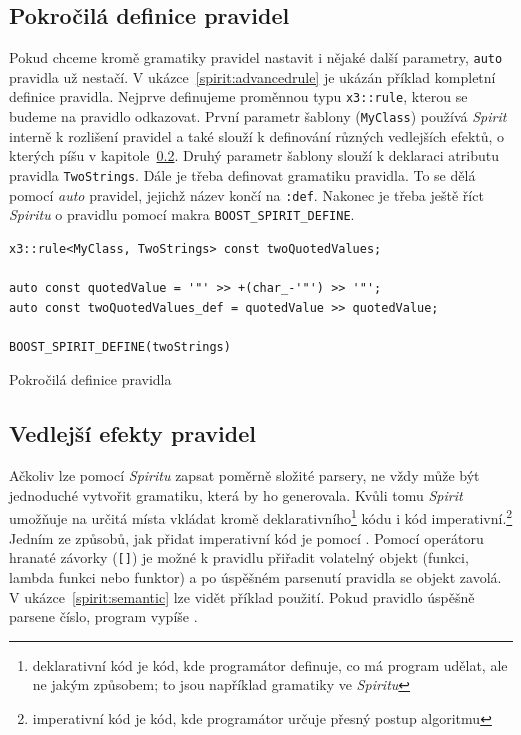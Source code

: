 \documentclass[thesis=B,czech,hidelinks]{FITthesis}[2019/03/06]
\begin{document}
\subsection{Pokročilá definice pravidel}\label{advanced:rules}
Pokud chceme kromě gramatiky pravidel nastavit i nějaké další parametry, \texttt{auto} pravidla už nestačí. V ukázce~\ref{spirit:advancedrule} je ukázán příklad kompletní definice pravidla. Nejprve definujeme proměnnou typu \texttt{x3::rule}, kterou se budeme na pravidlo odkazovat. První parametr šablony (\texttt{MyClass}) používá \textit{Spirit} interně k rozlišení pravidel a také slouží k definování různých vedlejších efektů, o kterých píšu v kapitole~\ref{sideeffects}. Druhý parametr šablony slouží k deklaraci atributu pravidla \texttt{TwoStrings}. Dále je třeba definovat gramatiku pravidla. To se dělá pomocí \textit{auto} pravidel, jejichž název končí na \verb¨:def¨. Nakonec je třeba ještě říct \textit{Spiritu} o pravidlu pomocí makra \verb¨BOOST_SPIRIT_DEFINE¨.

\begin{listing}
\begin{verbatim}
x3::rule<MyClass, TwoStrings> const twoQuotedValues;

auto const quotedValue = '"' >> +(char_-'"') >> '"';
auto const twoQuotedValues_def = quotedValue >> quotedValue;

BOOST_SPIRIT_DEFINE(twoStrings)
\end{verbatim}
\caption{Pokročilá definice pravidla}\label{spirit:advancedrule}
\end{listing}

\subsection{Vedlejší efekty pravidel}\label{sideeffects}
Ačkoliv lze pomocí \textit{Spiritu} zapsat poměrně složité parsery, ne vždy může být jednoduché vytvořit gramatiku, která by ho generovala. Kvůli tomu \textit{Spirit} umožňuje na určitá místa vkládat kromě deklarativního\footnote{deklarativní kód je kód, kde programátor definuje, co má program udělat, ale ne jakým způsobem; to jsou například gramatiky ve \textit{Spiritu}} kódu i kód imperativní.\footnote{imperativní kód je kód, kde programátor určuje přesný postup algoritmu} Jedním ze způsobů, jak přidat imperativní kód je pomocí . Pomocí operátoru hranaté závorky (\verb¨[]¨) je možné k pravidlu přiřadit volatelný objekt (funkci, lambda funkci nebo funktor) a po úspěšném parsenutí pravidla se objekt zavolá. V ukázce~\ref{spirit:semantic} lze vidět příklad použití. Pokud pravidlo úspěšně parsene číslo, program vypíše .
\end{document}
